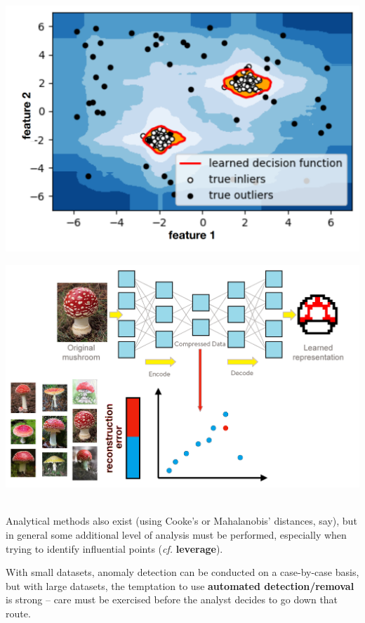 \documentclass[20pt,landscape,footrule,headrule]{foils}
\begin{document}
\newpage
\begin{center}
\includegraphics[width=\textwidth]{Images/IsoForest2.png}
\end{center}


\newpage
\begin{center}
\includegraphics[width=\textwidth]{Images/autoencoder2.png}
\end{center}

\newpage \ \\ \noindent
Analytical methods also exist (using Cooke's or Mahalanobis' distances, say), but in general some additional level of analysis must be performed, especially when trying to identify influential points (\textit{cf.} \textbf{leverage}). 

With small datasets, anomaly detection can be conducted on a case-by-case basis, but with large datasets, the temptation to use \textbf{automated detection/removal} is strong -- care must be exercised before the analyst decides to go down that route.
\end{document}
